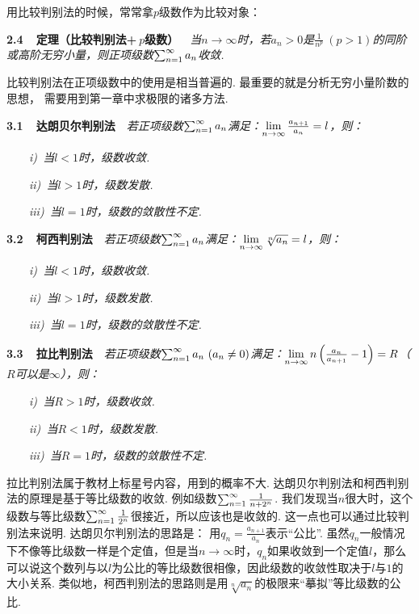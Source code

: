 用比较判别法的时候，常常拿$p$级数作为比较对象：\vspace{0.5em}

\textbf{2.4~~定理（比较判别法+$~p$级数）}~~\textit{当$n \to \infty$时，若$a_n > 0$是$\frac{1}{n^{p}} ~(p > 1)$的同阶或高阶无穷小量，则正项级数$\ss a_n$收敛.} \vspace{0.5em}

比较判别法在正项级数中的使用是相当普遍的.
最重要的就是分析无穷小量阶数的思想，
需要用到第一章中求极限的诸多方法.\vspace{1em}

\textbf{3.1~~达朗贝尔判别法}~~\textit{若正项级数$\ss a_n$满足：$\limn \frac{a_{n+1}}{a_n} = l$，则：}

~~~~\textit{i)~当$l < 1$时，级数收敛.}

~~~~\textit{ii)~当$l > 1$时，级数发散.}

~~~~\textit{iii)~当$l = 1$时，级数的敛散性不定.}\vspace{0.5em}

\textbf{3.2~~柯西判别法}~~\textit{若正项级数$\ss a_n$满足：$\limn \sqrt[n]{a_n} = l$，则：}

~~~~\textit{i)~当$l < 1$时，级数收敛.}

~~~~\textit{ii)~当$l > 1$时，级数发散.}

~~~~\textit{iii)~当$l = 1$时，级数的敛散性不定.}\vspace{0.5em}

\textbf{3.3~~拉比判别法}~~\textit{若正项级数$\ss a_n~(a_n \ne 0)$满足：$\limn n\left( \frac{a_n}{a_{n+1}} - 1 \right) = R$（$R$可以是$\infty$），则：}

~~~~\textit{i)~当$R > 1$时，级数收敛.}

~~~~\textit{ii)~当$R < 1$时，级数发散.}

~~~~\textit{iii)~当$R = 1$时，级数的敛散性不定.}\vspace{0.5em}

拉比判别法属于教材上标星号内容，用到的概率不大.
达朗贝尔判别法和柯西判别法的原理是基于等比级数的收敛.
例如级数$\ss \frac{1}{n + 2^n}$.
我们发现当$n$很大时，这个级数与等比级数$\ss \frac{1}{2^n}$很接近，所以应该也是收敛的.
这一点也可以通过比较判别法来说明.
达朗贝尔判别法的思路是：
用$q_n = \frac{a_{n+1}}{a_n}$表示“公比”.
虽然$q_n$一般情况下不像等比级数一样是个定值，但是当$n \to \infty$时，$q_n$如果收敛到一个定值$l$，那么可以说这个数列与以$l$为公比的等比级数很相像，因此级数的收敛性取决于$l$与$1$的大小关系.
类似地，柯西判别法的思路则是用$\sqrt[n]{a_n}$的极限来“摹拟”等比级数的公比.

